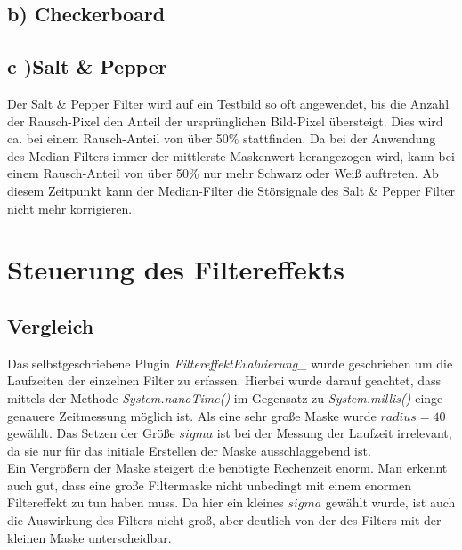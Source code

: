\documentclass[12pt,german]{article}
\begin{document}
\subsection{b) Checkerboard}
\subsection{c )Salt \& Pepper}
Der Salt \& Pepper Filter wird auf ein Testbild so oft angewendet, bis die Anzahl der Rausch-Pixel den Anteil der ursprünglichen Bild-Pixel übersteigt. Dies wird ca. bei einem Rausch-Anteil von über 50\% stattfinden. Da bei der Anwendung des Median-Filters immer der mittlerste Maskenwert herangezogen wird, kann bei einem Rausch-Anteil von über 50\% nur mehr Schwarz oder Weiß auftreten. Ab diesem Zeitpunkt kann der Median-Filter die Störsignale des Salt \& Pepper Filter nicht mehr korrigieren.



\newpage
\section{Steuerung des Filtereffekts }

\subsection{Vergleich}
Das selbstgeschriebene Plugin \textit{FiltereffektEvaluierung\_} wurde geschrieben um die Laufzeiten der einzelnen Filter zu erfassen. Hierbei wurde darauf geachtet, dass mittels der Methode \textit{System.nanoTime()} im Gegensatz zu \textit{System.millis()} einge genauere Zeitmessung möglich ist. Als eine sehr große Maske wurde $  radius = 40 $ gewählt. Das Setzen der Größe $ sigma $ ist bei der Messung der Laufzeit irrelevant, da sie nur für das initiale Erstellen der Maske ausschlaggebend ist. \\

Ein Vergrößern der Maske steigert die benötigte Rechenzeit enorm. Man erkennt auch gut, dass eine große Filtermaske nicht unbedingt mit einem enormen Filtereffekt zu tun haben muss. Da hier ein kleines $sigma$ gewählt wurde, ist auch die Auswirkung des Filters nicht groß, aber deutlich von der des Filters mit der kleinen Maske unterscheidbar.
\end{document}
